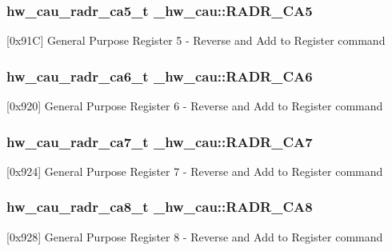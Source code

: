 \subsubsection[{\texorpdfstring{R\+A\+D\+R\+\_\+\+C\+A5}{RADR_CA5}}]{ {\bf hw\+\_\+cau\+\_\+radr\+\_\+ca5\+\_\+t} \+\_\+hw\+\_\+cau\+::\+R\+A\+D\+R\+\_\+\+C\+A5}\hypertarget{struct__hw__cau_a28a81d44b7b2abb496f0d06ead6917ca}{}\label{struct__hw__cau_a28a81d44b7b2abb496f0d06ead6917ca}
\mbox{[}0x91C\mbox{]} General Purpose Register 5 -\/ Reverse and Add to Register command 
\subsubsection[{\texorpdfstring{R\+A\+D\+R\+\_\+\+C\+A6}{RADR_CA6}}]{ {\bf hw\+\_\+cau\+\_\+radr\+\_\+ca6\+\_\+t} \+\_\+hw\+\_\+cau\+::\+R\+A\+D\+R\+\_\+\+C\+A6}\hypertarget{struct__hw__cau_a6ecf85cd735a089ba125df0939f59b0c}{}\label{struct__hw__cau_a6ecf85cd735a089ba125df0939f59b0c}
\mbox{[}0x920\mbox{]} General Purpose Register 6 -\/ Reverse and Add to Register command 
\subsubsection[{\texorpdfstring{R\+A\+D\+R\+\_\+\+C\+A7}{RADR_CA7}}]{ {\bf hw\+\_\+cau\+\_\+radr\+\_\+ca7\+\_\+t} \+\_\+hw\+\_\+cau\+::\+R\+A\+D\+R\+\_\+\+C\+A7}\hypertarget{struct__hw__cau_a6aa4c2cb2f3131ec241b6cc89a3684ac}{}\label{struct__hw__cau_a6aa4c2cb2f3131ec241b6cc89a3684ac}
\mbox{[}0x924\mbox{]} General Purpose Register 7 -\/ Reverse and Add to Register command 
\subsubsection[{\texorpdfstring{R\+A\+D\+R\+\_\+\+C\+A8}{RADR_CA8}}]{ {\bf hw\+\_\+cau\+\_\+radr\+\_\+ca8\+\_\+t} \+\_\+hw\+\_\+cau\+::\+R\+A\+D\+R\+\_\+\+C\+A8}\hypertarget{struct__hw__cau_a4407689f30d724fba19d05dff4d1f29e}{}\label{struct__hw__cau_a4407689f30d724fba19d05dff4d1f29e}
\mbox{[}0x928\mbox{]} General Purpose Register 8 -\/ Reverse and Add to Register command 
